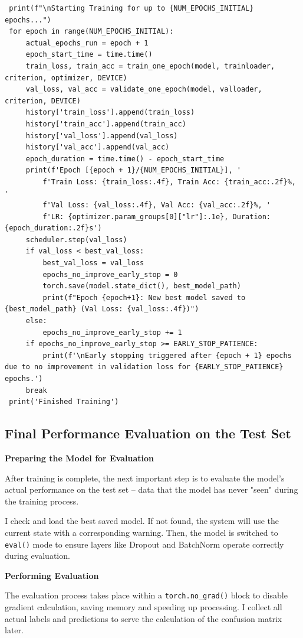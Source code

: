 \documentclass[12pt, a4paper, openany]{report}
\begin{document}
 \begin{verbatim}
 print(f"\nStarting Training for up to {NUM_EPOCHS_INITIAL} epochs...")
 for epoch in range(NUM_EPOCHS_INITIAL):
     actual_epochs_run = epoch + 1
     epoch_start_time = time.time()
     train_loss, train_acc = train_one_epoch(model, trainloader, criterion, optimizer, DEVICE)
     val_loss, val_acc = validate_one_epoch(model, valloader, criterion, DEVICE)
     history['train_loss'].append(train_loss)
     history['train_acc'].append(train_acc)
     history['val_loss'].append(val_loss)
     history['val_acc'].append(val_acc)
     epoch_duration = time.time() - epoch_start_time
     print(f'Epoch [{epoch + 1}/{NUM_EPOCHS_INITIAL}], '
         f'Train Loss: {train_loss:.4f}, Train Acc: {train_acc:.2f}%, '
         f'Val Loss: {val_loss:.4f}, Val Acc: {val_acc:.2f}%, '
         f'LR: {optimizer.param_groups[0]["lr"]:.1e}, Duration: {epoch_duration:.2f}s')
     scheduler.step(val_loss)
     if val_loss < best_val_loss:
         best_val_loss = val_loss
         epochs_no_improve_early_stop = 0
         torch.save(model.state_dict(), best_model_path)
         print(f"Epoch {epoch+1}: New best model saved to {best_model_path} (Val Loss: {val_loss:.4f})")
     else:
         epochs_no_improve_early_stop += 1
     if epochs_no_improve_early_stop >= EARLY_STOP_PATIENCE:
         print(f'\nEarly stopping triggered after {epoch + 1} epochs due to no improvement in validation loss for {EARLY_STOP_PATIENCE} epochs.')
     break
 print('Finished Training')
 \end{verbatim}

 \subsection{Final Performance Evaluation on the Test Set} %
 \textbf{Preparing the Model for Evaluation} %

 After training is complete, the next important step is to evaluate the model's actual performance on the test set – data that the model has never "seen" during the training process.

 I check and load the best saved model. If not found, the system will use the current state with a corresponding warning. Then, the model is switched to \texttt{eval()} mode to ensure layers like Dropout and BatchNorm operate correctly during evaluation.

 \textbf{Performing Evaluation} %

 The evaluation process takes place within a \texttt{torch.no\_grad()} block to disable gradient calculation, saving memory and speeding up processing. I collect all actual labels and predictions to serve the calculation of the confusion matrix later.
\end{document}
